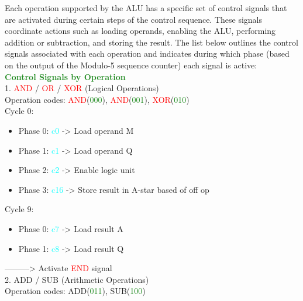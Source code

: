\documentclass[12pt, letterpaper]{article}
\begin{document}
Each operation supported by the ALU has a specific set of control signals that are activated during certain steps of the control sequence. These signals coordinate actions such as loading operands, enabling the ALU,
performing addition or subtraction, and storing the result. The list below outlines the control signals associated with each operation and indicates during which phase (based on the output of the Modulo-5 sequence counter) each
signal is active:\\

\textcolor{ForestGreen}{\textbf{Control Signals by Operation}}\\

1. \textcolor{red}{AND} / \textcolor{red}{OR} / \textcolor{red}{XOR} (Logical Operations)\\

Operation codes: \textcolor{red}{AND}(\textcolor{ForestGreen}{000}), \textcolor{red}{AND}(\textcolor{ForestGreen}{001}), \textcolor{red}{XOR}(\textcolor{ForestGreen}{010})\\

Cycle 0: 

\begin{itemize}
  \item Phase 0: \textcolor{cyan}{c0} -> Load operand M
  \item Phase 1: \textcolor{cyan}{c1} -> Load operand Q
  \item Phase 2: \textcolor{cyan}{c2} -> Enable logic unit
  \item Phase 3: \textcolor{cyan}{c16} -> Store result in A-star based of off op
\end{itemize}


Cycle 9:

\begin{itemize}
  \item Phase 0: \textcolor{cyan}{c7} -> Load result A
  \item Phase 1: \textcolor{cyan}{c8} -> Load result Q
\end{itemize}
---------> Activate \textcolor{red}{END} signal\\

2. \textcolor{BurntOrange}{ADD} / \textcolor{BurntOrange}{SUB} (Arithmetic Operations)\\

Operation codes: \textcolor{BurntOrange}{ADD}(\textcolor{ForestGreen}{011}), \textcolor{BurntOrange}{SUB}(\textcolor{ForestGreen}{100})\\
\end{document}
